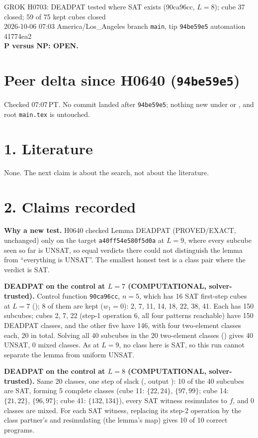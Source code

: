 \documentclass[11pt]{article}
\begin{document}
\sloppy
\begin{center}
{\Large GROK H0703: DEADPAT tested where SAT exists (90ca96cc, $L=8$); cube 37 closed; 59 of 75 kept cubes closed}\\[4pt]
2026-10-06 07:03 America/Los\_Angeles \quad branch \texttt{main}, tip \texttt{94be59e5} \quad automation 41774ea2\\[2pt]
\textbf{P versus NP: OPEN.}
\end{center}

\section*{Peer delta since H0640 (\texttt{94be59e5})}
Checked 07:07\,PT. No commit landed after \texttt{94be59e5}; nothing new under  or , and root \texttt{main.tex} is untouched.

\section*{1. Literature}
None. The next claim is about the search, not about the literature.

\section*{2. Claims recorded}
\textbf{Why a new test.} H0640 checked Lemma DEADPAT (PROVED/EXACT, unchanged) only on the target \texttt{a40ff54e580f5d0a} at $L=9$, where every subcube seen so far is UNSAT, so equal verdicts there could not distinguish the lemma from ``everything is UNSAT''. The smallest honest test is a class pair where the verdict is SAT.

\textbf{DEADPAT on the control at $L=7$ (COMPUTATIONAL, solver-trusted).} Control function \texttt{90ca96cc}, $n=5$, which has 16 SAT first-step cubes at $L=7$ (); 8 of them are kept ($w_1=0$): 2, 7, 11, 14, 18, 22, 38, 41. Each has 150 subcubes; cubes 2, 7, 22 (step-1 operation 6, all four patterns reachable) have 150 DEADPAT classes, and the other five have 146, with four two-element classes each, 20 in total. Solving all 40 subcubes in the 20 two-element classes () gives 40 UNSAT, 0 mixed classes. As at $L=9$, no class here is SAT, so this run cannot separate the lemma from uniform UNSAT.

\textbf{DEADPAT on the control at $L=8$ (COMPUTATIONAL, solver-trusted).} Same 20 classes, one step of slack (, output ): 10 of the 40 subcubes are SAT, forming 5 complete classes (cube 11: $\{22,24\}$, $\{97,99\}$; cube 14: $\{21,22\}$, $\{96,97\}$; cube 41: $\{132,134\}$), every SAT witness resimulates to $f$, and 0 classes are mixed. For each SAT witness, replacing its step-2 operation by the class partner's and resimulating (the lemma's map) gives 10 of 10 correct programs.
\end{document}
